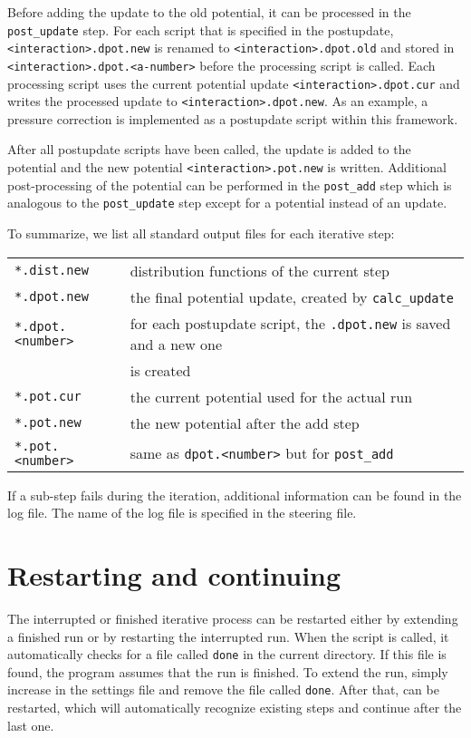Before adding the update to the old potential, it can be processed in the \texttt{post\_update} step. For each script that is specified in the postupdate, \texttt{<interaction>.dpot.new} is renamed  to \texttt{<interaction>.dpot.old} and stored in \texttt{<interaction>.dpot.<a-number>} before the processing script is called. Each processing script  uses the current potential update \texttt{<interaction>.dpot.cur} and writes the processed update to \texttt{<interaction>.dpot.new}. As an example, a pressure correction is implemented as a postupdate script within this framework.

After all postupdate scripts have been called, the update is added to the potential and the new potential \texttt{<interaction>.pot.new} is written. Additional post-processing of the potential can be performed in the \texttt{post\_add} step which is analogous to the \texttt{post\_update} step except for a potential instead of an update.

To summarize, we list all standard output files for each iterative step:

\begin{tabular}{ll}
\texttt{*.dist.new} & distribution functions of the current step \\
\texttt{*.dpot.new} & the final potential update, created by \texttt{calc\_update} \\
\texttt{*.dpot.<number>} & for each postupdate script, the \texttt{.dpot.new} is saved and a new one\\
&is created\\
\texttt{*.pot.cur} & the current potential used for the actual run\\
\texttt{*.pot.new} & the new potential after the add step \\
\texttt{*.pot.<number>} & same as \texttt{dpot.<number>} but for \texttt{post\_add}
\end{tabular}

If a sub-step fails during the iteration, additional information can be found in the log file. The name of the log file is specified in the steering \xml file.

\section{Restarting and continuing}
The interrupted or finished iterative process can be restarted either by extending a finished run or by restarting the interrupted run. When the script  is called, it automatically checks for a file called \texttt{done} in the current directory. If this file is found, the program assumes that the run is finished. To extend the run, simply increase  in the settings file and remove the file called \texttt{done}. After that,  can be restarted, which will automatically recognize existing steps and continue after the last one.

